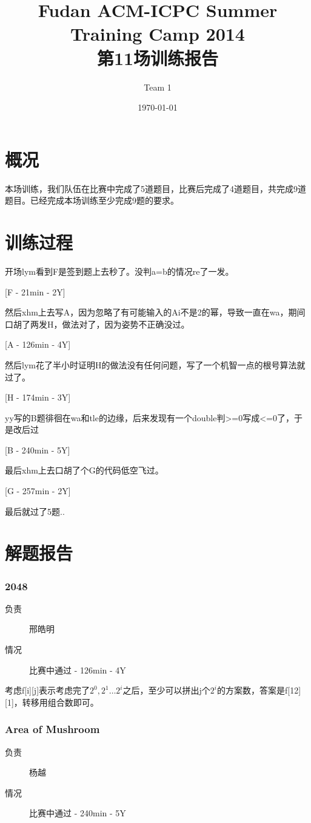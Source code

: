 \documentclass[a4paper, 11pt, nofonts, nocap, fancyhdr]{ctexart}
\title{Fudan ACM-ICPC Summer Training Camp 2014\\第11场训练报告}
\author{Team 1}
\date{\today}
\newcommand{\problem}[1]{\subsubsection{#1}}
\begin{document}
\maketitle

\section{概况}

本场训练，我们队伍在比赛中完成了5道题目，比赛后完成了4道题目，共完成9道题目。已经完成本场训练至少完成9题的要求。

\section{训练过程}

开场lym看到F是签到题上去秒了。没判a=b的情况re了一发。

[F - 21min - 2Y]

然后xhm上去写A，因为忽略了有可能输入的Ai不是2的幂，导致一直在wa，期间口胡了两发H，做法对了，因为姿势不正确没过。

[A - 126min - 4Y]

然后lym花了半小时证明H的做法没有任何问题，写了一个机智一点的根号算法就过了。

[H - 174min - 3Y]

yy写的B题徘徊在wa和tle的边缘，后来发现有一个double判>=0写成<=0了，于是改后过

[B - 240min - 5Y]

最后xhm上去口胡了个G的代码低空飞过。

[G - 257min - 2Y]

最后就过了5题..

\section{解题报告}

\problem{2048}

\begin{description}
\item[负责] 邢皓明
\item[情况] 比赛中通过 - 126min - 4Y
\end{description}

考虑f[i][j]表示考虑完了$2^0,2^1\dots 2^i$之后，至少可以拼出j个$2^i$的方案数，答案是f[12][1]，转移用组合数即可。

\problem{Area of Mushroom}

\begin{description}
\item[负责] 杨越
\item[情况] 比赛中通过 - 240min - 5Y
\end{description}
\end{document}
